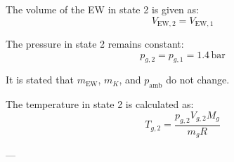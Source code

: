 The volume of the EW in state 2 is given as:  
\[
V_{\text{EW},2} = V_{\text{EW},1}
\]  

The pressure in state 2 remains constant:  
\[
p_{g,2} = p_{g,1} = 1.4 \, \text{bar}
\]  

It is stated that \( m_{\text{EW}} \), \( m_K \), and \( p_{\text{amb}} \) do not change.  

The temperature in state 2 is calculated as:  
\[
T_{g,2} = \frac{p_{g,2} V_{g,2} M_g}{m_g R}
\]  

---